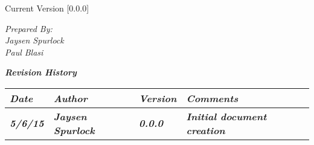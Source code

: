 
Current Version [0.0.0]
\vspace*{5mm}

{\color{MSBlue3}
\noindent
\textit{Prepared By:}\\
\textit{Jaysen Spurlock}\\
\textit{Paul Blasi}
}

\newcommand{\revision}[4]
{
    \textit{\textbf{#1}}
    & \textit{\textbf{#2}}
    & \textit{\textbf{#3}}
    & \textit{\textbf{#4}}
    \tabularnewline\hline
}

\vfill
\noindent
{\color{color02} \textit{\textbf{Revision History}}}\\
\begin{tabular}{|>{\raggedright}p{1.5cm}
                |>{\raggedright}p{3cm}
                |>{\raggedright}p{1.5cm}
                |>{\raggedright}p{9cm}
                |}
\hline

\revision{Date}{Author}{Version}{Comments}
\revision{5/6/15}{Jaysen Spurlock}{0.0.0}{Initial document creation}
\end{tabular}
\vfill
